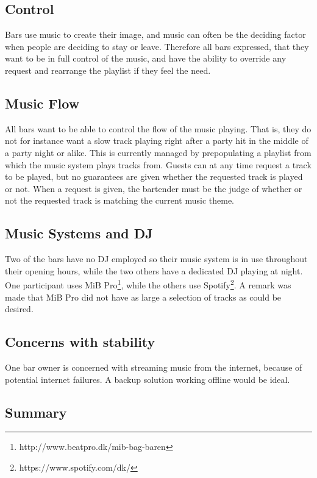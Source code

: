 \subsection{Control}
\label{sub:Control}
Bars use music to create their image, and music can often be the deciding factor when people are deciding to stay or leave. Therefore all bars expressed, that they want to be in full control of the music, and have the ability to override any request and rearrange the playlist if they feel the need.

\subsection{Music Flow}
\label{sub:MusicFlow}

All bars want to be able to control the flow of the music playing. That is, they do not for instance want a slow track playing right after a party hit in the middle of a party night or alike. This is currently managed by prepopulating a playlist from which the music system plays tracks from. Guests can at any time request a track to be played, but no guarantees are given whether the requested track is played or not. When a request is given, the bartender must be the judge of whether or not the requested track is matching the current music theme.

\subsection{Music Systems and DJ}
\label{sub:differences}
Two of the bars have no DJ employed so their music system is in use throughout their opening hours, while the two others have a dedicated DJ playing at night. One participant uses MiB Pro\footnote{http://www.beatpro.dk/mib-bag-baren}, while the others use Spotify\footnote{https://www.spotify.com/dk/}. A remark was made that MiB Pro did not have as large a selection of tracks as could be desired.

\subsection{Concerns with stability}
\label{sub:specific_remarks}

One bar owner is concerned with streaming music from the internet, because of potential internet failures. A backup solution working offline would be ideal.

\subsection{Summary}
\label{sub:summary}

